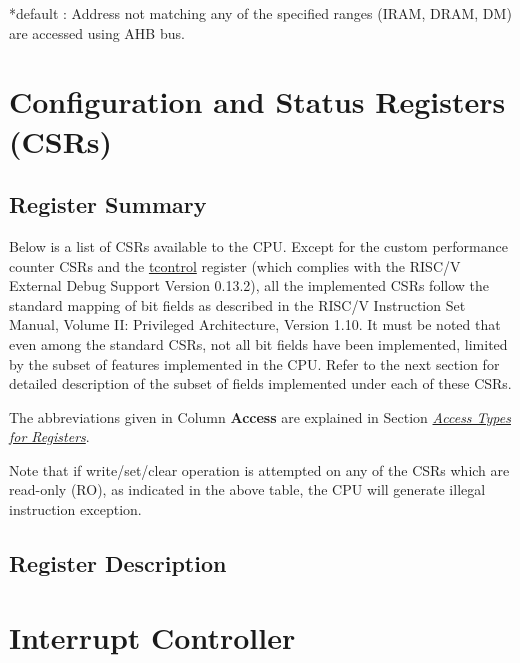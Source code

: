 \documentclass[main\_\_EN.tex]{subfiles}
\begin{document}
*default : Address not matching any of the specified ranges (IRAM, DRAM, DM) are accessed using AHB bus.



\section{Configuration and Status Registers (CSRs)}
\hypertarget{riscvcpu-cpu-reg-summ}{}
\subsection{Register Summary}
\label{sec:riscvcpu-cpu-reg-summ}


Below is a list of CSRs available to the CPU. Except for the custom performance counter CSRs and the \hyperref[regdesc:TCONTROL]{tcontrol} register (which complies with the RISC\-/V External Debug Support Version 0.13.2), all the implemented CSRs follow the standard mapping of bit fields as described in the RISC\-/V Instruction Set Manual, Volume II: Privileged Architecture, Version 1.10. It must be noted that even among the standard CSRs, not all bit fields have been implemented, limited by the subset of features implemented in the CPU. Refer to the next section for detailed description of the subset of fields implemented under each of these CSRs.

The abbreviations given in Column \textbf{Access} are explained in Section \hyperref[glossary-access-types]{\textit{Access Types for Registers}}.



Note that if write/set/clear operation is attempted on any of the CSRs which are read-only (RO), as indicated in the above table, the CPU will generate illegal instruction exception.

\subsection{Register Description}




\clearpage
\section{Interrupt Controller}
\label{sec:riscvcpu-int-ctrl}
\end{document}

